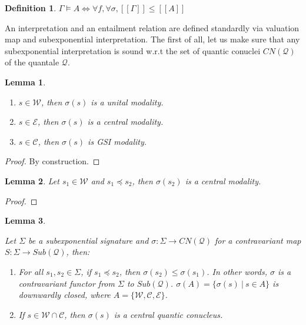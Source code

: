 \documentclass[a4paper]{article}
\theoremstyle{defin}
\newtheorem{defin}{Definition}
\theoremstyle{theorem}
\theoremstyle{prop}
\theoremstyle{lemma}
\newtheorem{lemma}{Lemma}
\theoremstyle{ex}
\theoremstyle{col}
\begin{document}
\begin{defin}
  $\Gamma \models A \Leftrightarrow \forall f, \forall \sigma, [\![\Gamma]\!] \leq [\![A]\!]$
\end{defin}

An interpretation and an entailment relation are defined standardly via valuation map and subexponential interpretation.
The first of all, let us make sure that any subexponential interpretation is sound w.r.t the set of quantic conuclei $CN(\mathcal{Q})$ of the quantale $\mathcal{Q}$.

\begin{lemma}
  $ $

  \begin{enumerate}
    \item $s \in \mathcal{W}$, then $\sigma(s)$ is a unital modality.
    \item $s \in \mathcal{E}$, then $\sigma(s)$ is a central modality.
    \item $s \in \mathcal{C}$, then $\sigma(s)$ is GSI modality.
  \end{enumerate}
\end{lemma}

\begin{proof}
  By construction.
\end{proof}

\begin{lemma}
  Let $s_1 \in \mathcal{W}$ and $s_1 \preceq s_2$, then $\sigma(s_2)$ is a central modality.
\end{lemma}

\begin{proof}
\end{proof}


\begin{lemma}
  $ $

  Let $\Sigma$ be a subexponential signature and $\sigma : \Sigma \to CN(\mathcal{Q})$ for a contravariant map
  $S : \Sigma \to Sub(\mathcal{Q})$, then:
  \begin{enumerate}
  \item For all $s_1, s_2 \in \Sigma$, if $s_1 \preceq s_2$, then $\sigma(s_2) \leq \sigma(s_1)$.
  In other words, $\sigma$ is a contravariant functor from $\Sigma$ to $Sub(\mathcal{Q})$.
  $\sigma(A) = \{ \sigma(s) \: | \: s \in A \}$ is downwardly closed, where $A = \{ \mathcal{W}, \mathcal{C}, \mathcal{E} \}$.
  \item If $s \in \mathcal{W} \cap \mathcal{C}$, then $\sigma(s)$ is a central quantic conucleus.
\end{enumerate}
\end{lemma}
\end{document}
